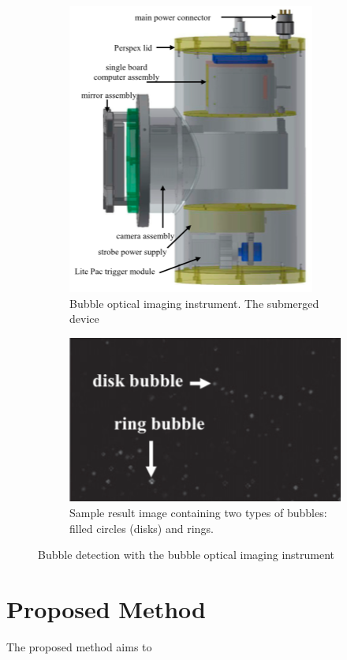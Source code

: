 		\begin{figure}[h]
			\centering
			\begin{subfigure}[t]{0.4\textwidth}
				\centering
				\includegraphics[scale=.3]{images/bubble_optical_imaging_instrument.png}
				\caption{Bubble optical imaging instrument. The submerged device }
				\label{subfig:optical_imaging}
			\end{subfigure}\hfill
			\begin{subfigure}[t]{0.4\textwidth}
				\centering
				\includegraphics[scale=.5]{images/sample_result_optical_imaging_instrument.png}
				\caption{Sample result image containing two types of bubbles: filled circles (disks) and rings. }
				\label{subfig:result_optical_imaging}
			\end{subfigure}
			\label{fig:optical_imaging}
			\caption{Bubble detection with the bubble optical imaging instrument}
		\end{figure}		


\section{Proposed Method}
The proposed method aims to 




















